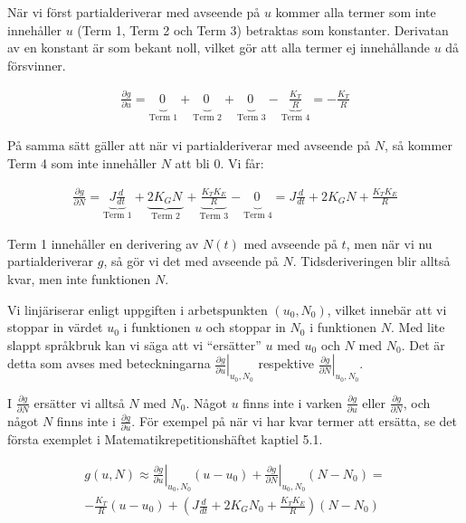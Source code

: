 \documentclass[a4paper]{article}
\begin{document}
När vi först partialderiverar med avseende på $u$ kommer alla termer som inte innehåller $u$ (Term 1, Term 2 och Term 3) betraktas som konstanter. Derivatan av en konstant är som bekant noll, vilket gör att alla termer ej innehållande $u$ då försvinner.

\begin{align*}
  \frac{\partial g}{\partial u} = \underbrace{0\frac{ }{ }}_{\text{Term 1}} + \underbrace{0\frac{ }{ }}_{\text{Term 2}} + \underbrace{0\frac{ }{ }}_{\text{Term 3}} - \underbrace{\frac{K_T}{R}}_{\text{Term 4}} = -\frac{K_T}{R}
\end{align*}

På samma sätt gäller att när vi partialderiverar med avseende på $N$, så kommer Term 4 som inte innehåller $N$ att bli 0. Vi får:

\begin{align*}
  \frac{\partial g}{\partial N} = \underbrace{J\frac{d}{dt}}_{\text{Term 1}} + \underbrace{2K_G N\frac{ }{ }}_{\text{Term 2}} + \underbrace{\frac{K_T K_E}{R}}_{\text{Term 3}} - \underbrace{0\frac{ }{ }}_{\text{Term 4}} = J\frac{d}{dt} + 2K_G N + \frac{K_T K_E}{R}
\end{align*}

Term 1 innehåller en derivering av $N(t)$ med avseende på $t$, men när vi nu partialderiverar $g$, så gör vi det med avseende på $N$. Tidsderiveringen blir alltså kvar, men inte funktionen $N$.

Vi linjäriserar enligt uppgiften i arbetspunkten $(u_0, N_0)$, vilket innebär att vi stoppar in värdet $u_0$ i funktionen $u$ och stoppar in $N_0$ i funktionen $N$. Med lite slappt språkbruk kan vi säga att vi ``ersätter'' $u$ med $u_0$ och $N$ med $N_0$. Det är detta som avses med beteckningarna $\left. \frac{\partial g}{\partial u} \right|_{u_0, N_0}$ respektive $\left. \frac{\partial g}{\partial N} \right|_{u_0, N_0}$.

I $\frac{\partial g}{\partial N}$ ersätter vi alltså $N$ med $N_0$. Något $u$ finns inte i varken $\frac{\partial g}{\partial u}$ eller $\frac{\partial g}{\partial N}$, och något $N$ finns inte i $\frac{\partial g}{\partial u}$. För exempel på när vi har kvar termer att ersätta, se det första exemplet i Matematikrepetitionshäftet kaptiel 5.1.

\begin{align*}
  g(u, N) \approx \left. \frac{\partial g}{\partial u}\right|_{u_0, N_0}(u - u_0) + \left. \frac{\partial g}{\partial N}\right|_{u_0, N_0}(N - N_0) = \\
  -\frac{K_T}{R}(u - u_0) + \left(J\frac{d}{dt} + 2K_G N_0 + \frac{K_T K_E}{R} \right)(N - N_0)
\end{align*}
\end{document}
